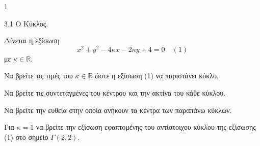 \begin{ylh}{1}
    \item 3.1 Ο Κύκλος.
\end{ylh}
Δίνεται η εξίσωση
\[ x^2 + y^2 - 4\kappa x - 2\kappa y + 4 = 0 \quad (1) \]
με $\kappa \in \mathbb{R}$.

\begin{alist}
\item Να βρείτε τις τιμές του $\kappa \in \mathbb{R}$ ώστε η εξίσωση (1) να παριστάνει κύκλο. 
\item Να βρείτε τις συντεταγμένες του κέντρου και την ακτίνα του κάθε κύκλου. 
\item Να βρείτε την ευθεία στην οποία ανήκουν τα κέντρα των παραπάνω κύκλων. 
\item Για $\kappa = 1$ να βρείτε την εξίσωση εφαπτομένης του αντίστοιχου κύκλου της εξίσωσης (1) στο σημείο $\Gamma(2,2)$. 
\end{alist}